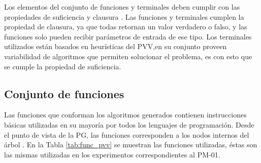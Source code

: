 Los elementos del conjunto de funciones y terminales deben cumplir con las propiedades de suficiencia y clausura \citep{poli_2008}. Las funciones y terminales cumplen la propiedad de clausura, ya que todas retornan un valor verdadero o falso, y las funciones solo pueden recibir parámetros de entrada de ese tipo. Los terminales utilizados están basados en heurísticas del PVV,en su conjunto proveen variabilidad de algoritmos que permiten solucionar el problema, es con esto que se cumple la propiedad de suficiencia. 

\subsection{Conjunto de funciones}

Las funciones que conforman los algoritmos generados contienen instrucciones básicas utilizadas en su mayoría por todos los lenguajes de programación. Desde el punto de vista de la PG, las funciones corresponden a los nodos internos del árbol \citep{koza_poli_2005}. En la Tabla \ref{tab:func_pvv} se muestran las funciones utilizadas, éstas son las mismas utilizadas en los experimentos correspondientes al PM-01.

